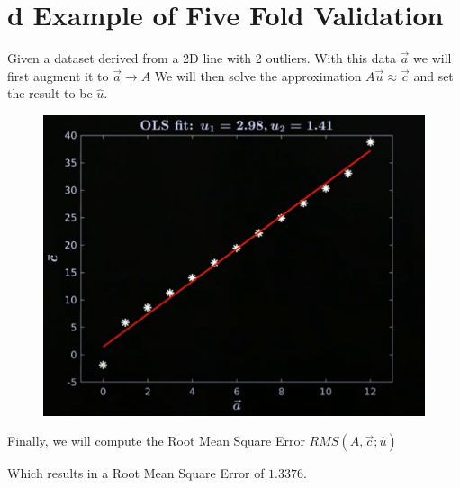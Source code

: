 \documentclass[12pt]{book}
\begin{document}
\section*{d Example of Five Fold Validation}
Given a dataset derived from a 2D line with 2 outliers. With this data $\vec a$ we will first augment it to $\vec a \to A$
We will then solve the approximation  $A\vec u \approx \vec c$ and set the result to be $\hat{u}$.
 \begin{figure}[h]
         \centering
         \includegraphics[scale=0.5]{./figures/RMS}
\end{figure}

Finally, we will compute the Root Mean Square Error $RMS(A,\vec c;\hat{u})$


Which results in a Root Mean Square Error of $1.3376$. 
\end{document}
